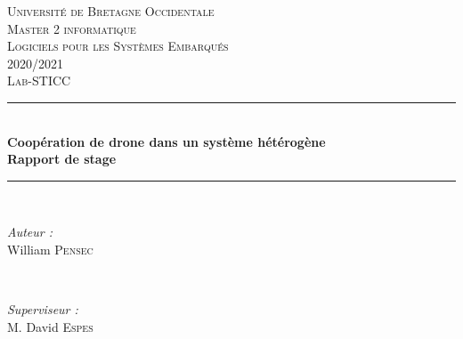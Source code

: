 \begin{titlepage}
    
    \newcommand{\HRule}{\rule{\linewidth}{0.5mm}} %
    
    \center %
     
    
    \textsc{\LARGE Université de Bretagne Occidentale}\\[1cm] %
	\textsc{\Large Master 2 informatique}\\[0.2cm] %
	\textsc{\large Logiciels pour les Systèmes Embarqués}\\[0.5cm] %
	{\large 2020/2021}\\[0.6cm] %
		
    \textsc{\large Lab-STICC}\\[0.5cm] %
    
    
    \HRule \\[0.4cm]
    { \Huge \bfseries Coopération de drone dans un système hétérogène \\[0.6cm]
      \LARGE \bfseries Rapport de stage
    }\\[0.4cm] %
    \HRule \\[1cm]
     
    
    \begin{minipage}{0.4\textwidth}
    \begin{flushleft} \large
    \emph{Auteur :}\\
    William \textsc{Pensec} %
    \end{flushleft}
    \end{minipage}
    ~
    \begin{minipage}{0.4\textwidth}
    \begin{flushright} \large
    \emph{Superviseur :} \\
    M. David \textsc{Espes} %
    \end{flushright}
    \end{minipage}\\[1cm]
		

\end{titlepage}
